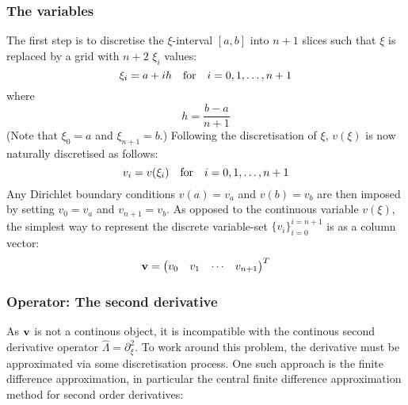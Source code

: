 \documentclass[reprint,english]{revtex4-1}
\begin{document}
\subsubsection{The variables}
The first step is to discretise the \(\xi\)-interval \([a,b]\) into \(n+1\) slices such that \(\xi\) is replaced by a grid with \(n+2\) \(\xi_i\) values:
\begin{equation}
\xi_i=a+ih\qfor i=0,1,\ldots,n+1
\end{equation}
where
\begin{equation}
h=\frac{b-a}{n+1}
\end{equation}
(Note that \(\xi_0=a\) and \(\xi_{n+1}=b\).) Following the discretisation of \(\xi\), \(v(\xi)\) is now naturally discretised as follows:
\begin{equation}
v_i=v(\xi_i)\qfor i=0,1,\ldots,n+1
\end{equation}
Any Dirichlet boundary conditions \(v(a)=v_a\) and \(v(b)=v_b\) are then imposed by setting \(v_0=v_a\) and \(v_{n+1}=v_b\). As opposed to the continuous variable \(v(\xi)\), the simplest way to represent the discrete variable-set \(\{v_i\}_{i=0}^{i=n+1}\) is as a column vector:
\begin{equation}
\vb{v}=\mqty(v_0&v_1&\cdots&v_{n+1})^T
\end{equation}
\subsubsection{Operator: The second derivative}
As \(\vb{v}\) is not a continous object, it is incompatible with the continous second derivative operator \(\hat{\Lambda}=\partial_\xi^2\). To work around this problem, the derivative must be approximated via some discretisation process. One such approach is the finite difference approximation, in particular the central finite difference approximation method for second order derivatives:
\end{document}
